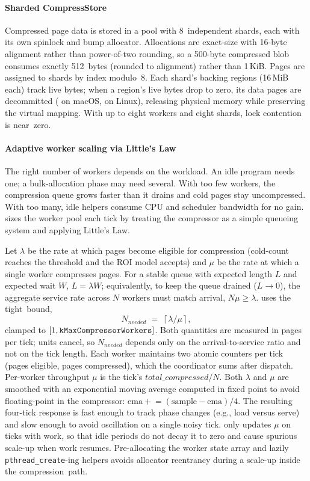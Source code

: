 \paragraph{Sharded CompressStore}  Compressed page data is stored
in a pool with 8~independent shards, each with its own spinlock
and bump allocator.  Allocations are exact-size with 16-byte
alignment rather than power-of-two rounding, so a 500-byte
compressed blob consumes exactly 512~bytes (rounded to alignment)
rather than 1\,KiB.  Pages are assigned to shards by index
modulo~8.  Each shard's backing regions (16\,MiB each) track live
bytes; when a region's live bytes drop to zero, its data pages are
decommitted ( on
macOS,  on Linux), releasing
physical memory while preserving the virtual mapping.  With up to
eight workers and eight shards, lock contention is near~zero.

\paragraph{Adaptive worker scaling via Little's Law}
\label{sec:impl:little}
The right number of workers depends on the workload.  An idle
program needs one; a bulk-allocation phase may need several.
With too few workers, the compression queue grows faster than it
drains and cold pages stay uncompressed.  With too many, idle
helpers consume CPU and scheduler bandwidth for no gain.
\sys sizes the worker pool each tick by treating the compressor
as a simple queueing system and applying Little's Law.

Let $\lambda$ be the rate at which pages become eligible for
compression (cold-count reaches the threshold and the ROI model
accepts) and $\mu$ be the rate at which a single worker compresses
pages.  For a stable queue with expected length $L$ and expected
wait $W$, $L = \lambda W$; equivalently, to keep the queue drained
($L \to 0$), the aggregate service rate across $N$ workers must
match arrival, $N \mu \geq \lambda$.  \sys uses the tight~bound,
\[
  N_{\mathit{needed}} \;=\; \left\lceil \lambda / \mu \right\rceil,
\]
clamped to $[1, \texttt{\hspace{0pt}kMaxCompressorWorkers}]$.  Both quantities
are measured in pages per tick; units cancel, so
$N_{\mathit{needed}}$ depends only on the arrival-to-service ratio
and not on the tick length.  Each worker maintains two atomic
counters per tick (pages eligible, pages compressed), which the
coordinator sums after dispatch.  Per-worker throughput $\mu$ is
the tick's $\mathit{total\_compressed} / N$.  Both $\lambda$ and
$\mu$ are smoothed with an exponential moving average computed in
fixed point to avoid floating-point in the compressor:
$\mathrm{ema} \mathrel{+}= (\mathrm{sample} - \mathrm{ema})/4$.
The resulting four-tick response is fast enough to track phase
changes (e.g., load versus serve) and slow enough to avoid
oscillation on a single noisy tick.  \sys only updates $\mu$ on
ticks with work, so that idle periods do not decay it to zero and
cause spurious scale-up when work resumes.  Pre-allocating the
worker state array and lazily \texttt{pthread\_create}-ing helpers
avoids allocator reentrancy during a scale-up inside the
compression~path.

